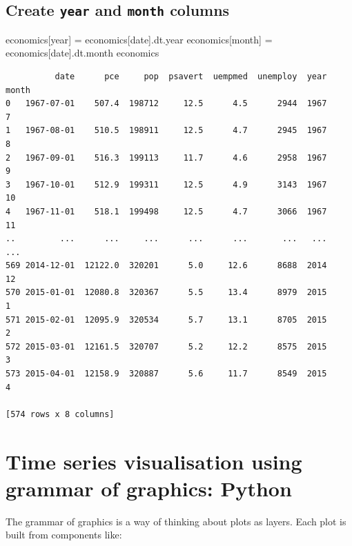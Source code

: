 \documentclass[
  11pt,
  a4paper,
]{report}
\newenvironment{Shaded}{\begin{snugshade}}{\end{snugshade}}
\newcommand{\NormalTok}[1]{\textcolor[rgb]{0.00,0.23,0.31}{#1}}
\newcommand{\OperatorTok}[1]{\textcolor[rgb]{0.37,0.37,0.37}{#1}}
\newcommand{\StringTok}[1]{\textcolor[rgb]{0.13,0.47,0.30}{#1}}
\begin{document}
\subsection{\texorpdfstring{Create \texttt{year} and \texttt{month}
columns}{Create year and month columns}}\label{create-year-and-month-columns}

\begin{Shaded}
\begin{Highlighting}[]
\NormalTok{economics[}\StringTok{\textquotesingle{}year\textquotesingle{}}\NormalTok{] }\OperatorTok{=}\NormalTok{ economics[}\StringTok{\textquotesingle{}date\textquotesingle{}}\NormalTok{].dt.year}
\NormalTok{economics[}\StringTok{\textquotesingle{}month\textquotesingle{}}\NormalTok{] }\OperatorTok{=}\NormalTok{ economics[}\StringTok{\textquotesingle{}date\textquotesingle{}}\NormalTok{].dt.month}
\NormalTok{economics}
\end{Highlighting}
\end{Shaded}

\begin{verbatim}
          date      pce     pop  psavert  uempmed  unemploy  year  month
0   1967-07-01    507.4  198712     12.5      4.5      2944  1967      7
1   1967-08-01    510.5  198911     12.5      4.7      2945  1967      8
2   1967-09-01    516.3  199113     11.7      4.6      2958  1967      9
3   1967-10-01    512.9  199311     12.5      4.9      3143  1967     10
4   1967-11-01    518.1  199498     12.5      4.7      3066  1967     11
..         ...      ...     ...      ...      ...       ...   ...    ...
569 2014-12-01  12122.0  320201      5.0     12.6      8688  2014     12
570 2015-01-01  12080.8  320367      5.5     13.4      8979  2015      1
571 2015-02-01  12095.9  320534      5.7     13.1      8705  2015      2
572 2015-03-01  12161.5  320707      5.2     12.2      8575  2015      3
573 2015-04-01  12158.9  320887      5.6     11.7      8549  2015      4

[574 rows x 8 columns]
\end{verbatim}

\section{Time series visualisation using grammar of graphics:
Python}\label{time-series-visualisation-using-grammar-of-graphics-python}

The grammar of graphics is a way of thinking about plots as layers. Each
plot is built from components like:
\end{document}
